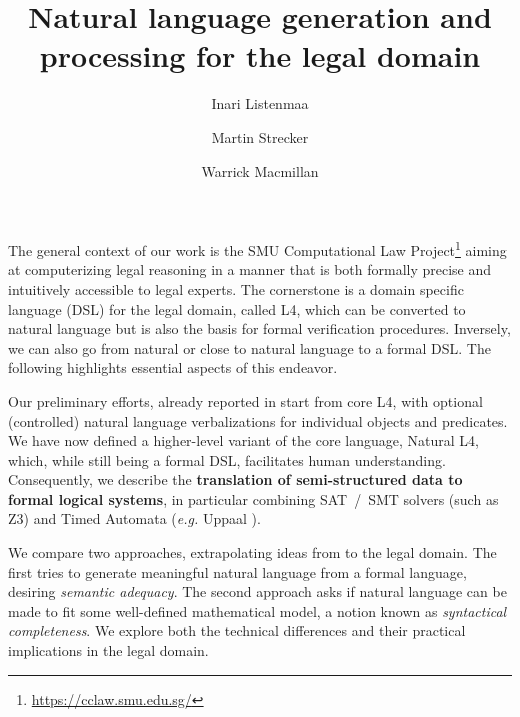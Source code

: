 \documentclass[runningheads]{llncs}
\begin{document}
%
\title{Natural language generation and processing for the legal domain}
%
%
\author{Inari Listenmaa \and
Martin Strecker \and
Warrick Macmillan}
%
%
%
%
\maketitle              %
%

%
%
%
The general context of our work is the SMU Computational Law Project\footnote{\url{https://cclaw.smu.edu.sg/}} aiming at computerizing legal reasoning in a manner that is both formally precise and intuitively accessible to legal experts. 
The cornerstone is a domain specific language (DSL) for the legal domain, called L4, which can be converted to natural language but is also the basis for formal verification procedures. Inversely, we can also go from natural or close to natural language to a formal DSL. The following highlights essential aspects of this endeavor. 

Our preliminary efforts, already reported in  \cite{listenmaa-etal-2021-towards,listenmaa2021nlg} 
start from core L4, with optional (controlled) natural language verbalizations for individual objects and predicates. We have now defined a higher-level variant of the core language, Natural L4, which, while still being a formal DSL, facilitates human understanding. Consequently, we describe the \textbf{translation of semi-structured data to formal logical systems}, in particular combining SAT~/~SMT solvers (such as Z3\cite{}) and Timed Automata (\emph{e.g.} Uppaal \cite{}). 

We compare two approaches, extrapolating ideas from \cite{macmillan2021} to the legal domain. The first tries to generate meaningful natural language from a formal language, desiring \emph{semantic adequacy}. The second approach asks if natural language can be made to fit some well-defined mathematical model, a notion known as \emph{syntactical completeness}.
We explore both the technical differences and their practical implications in the legal domain. 
\end{document}
